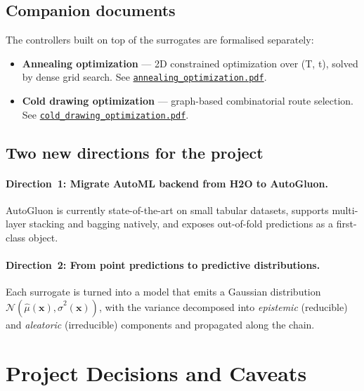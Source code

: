 \documentclass[11pt,a4paper]{article}
\begin{document}
\subsection{Companion documents}

The controllers built on top of the surrogates are formalised separately:
\begin{itemize}
    \item \textbf{Annealing optimization} --- 2D constrained optimization over (T, t), solved by dense grid search. See \href{https://drive.google.com/file/d/1dMrTbz4iGtGpthyRBU4M1-V0mrxIWbfK/view?usp=drive_link}{\texttt{annealing\_optimization.pdf}}.
    \item \textbf{Cold drawing optimization} --- graph-based combinatorial route selection. \\ See \href{https://drive.google.com/file/d/1CmDZxgh3cOcopIMbxvVBxugg_9li79cP/view?usp=drive_link}{\texttt{cold\_drawing\_optimization.pdf}}.
\end{itemize}

\subsection{Two new directions for the project}

\paragraph{Direction~1: Migrate AutoML backend from H2O to AutoGluon.} AutoGluon is currently state-of-the-art on small tabular datasets, supports multi-layer stacking and bagging natively, and exposes out-of-fold predictions as a first-class object.

\paragraph{Direction~2: From point predictions to predictive distributions.} Each surrogate is turned into a model that emits a Gaussian distribution $\mathcal{N}(\hat\mu(\bm x), \hat\sigma^2(\bm x))$, with the variance decomposed into \emph{epistemic} (reducible) and \emph{aleatoric} (irreducible) components and propagated along the chain.

\newpage
\section{Project Decisions and Caveats}
\label{sec:decisions}
\end{document}
